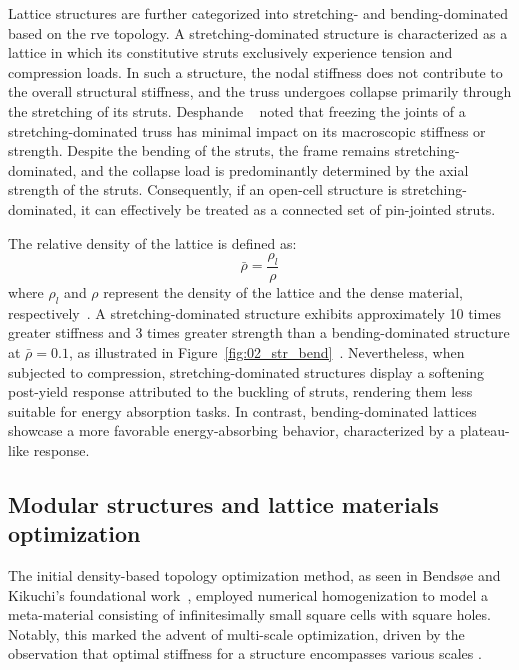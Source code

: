 Lattice structures are further categorized into stretching- and bending-dominated based on the \gls{rve} topology. A stretching-dominated structure is characterized as a lattice in which its constitutive struts exclusively experience tension and compression loads. In such a structure, the nodal stiffness does not contribute to the overall structural stiffness, and the truss undergoes collapse primarily through the stretching of its struts. Desphande \etal~\cite{deshpande_foam_2001} noted that freezing the joints of a stretching-dominated truss has minimal impact on its macroscopic stiffness or strength. Despite the bending of the struts, the frame remains stretching-dominated, and the collapse load is predominantly determined by the axial strength of the struts. Consequently, if an open-cell structure is stretching-dominated, it can effectively be treated as a connected set of pin-jointed struts.

The relative density of the lattice is defined as:
\begin{equation}
    \bar{\rho} = \frac{\rho_l}{\rho}
\end{equation}
where $\rho_l$ and $\rho$ represent the density of the lattice and the dense material, respectively~. A stretching-dominated structure exhibits approximately 10 times greater stiffness and 3 times greater strength than a bending-dominated structure at $\bar{\rho} = 0.1$, as illustrated in Figure~\ref{fig:02_str_bend}~\cite{deshpande_foam_2001}. Nevertheless, when subjected to compression, stretching-dominated structures display a softening post-yield response attributed to the buckling of struts, rendering them less suitable for energy absorption tasks. In contrast, bending-dominated lattices showcase a more favorable energy-absorbing behavior, characterized by a plateau-like response.

\subsection{Modular structures and lattice materials optimization}
The initial density-based topology optimization method, as seen in Bendsøe and Kikuchi's foundational work~, employed numerical homogenization to model a meta-material consisting of infinitesimally small square cells with square holes. Notably, this marked the advent of multi-scale optimization, driven by the observation that optimal stiffness for a structure encompasses various scales .

